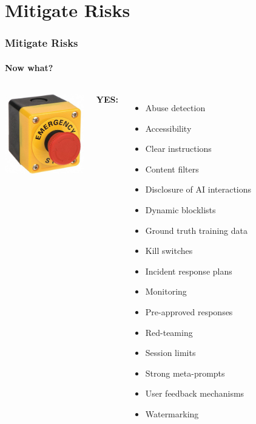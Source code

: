 \documentclass[11pt,
               aspectratio=169,
               hyperref={colorlinks}
               ]{beamer}
\begin{document}
	\section{Mitigate Risks}

		\begin{frame}
			
			\frametitle{Mitigate Risks}
			\framesubtitle{Now what?}
			
			\begin{columns}
				
					\vspace{5pt}
					\centering
					\includegraphics[height=100pt]{../img/buzzer.png}
				
					\textbf{YES:}
					\begin{itemize}\tiny
						\item Abuse detection
						\item Accessibility
						\item Clear instructions
						\item Content filters
						\item Disclosure of AI interactions
						\item Dynamic blocklists
						\item Ground truth training data
						\item Kill switches					
						\item Incident response plans
						\item Monitoring
						\item Pre-approved responses
						\item Red-teaming
						\item Session limits
						\item Strong meta-prompts
						\item User feedback mechanisms
						\item Watermarking
					\end{itemize}
			

\end{columns}
\end{frame}
\end{document}
